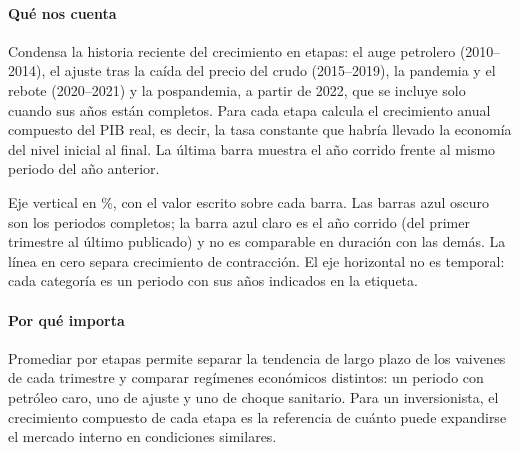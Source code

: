 \paragraph{Qué nos cuenta}
Condensa la historia reciente del crecimiento en etapas: el auge petrolero (2010–2014), el ajuste tras la caída del precio del crudo (2015–2019), la pandemia y el rebote (2020–2021) y la pospandemia, a partir de 2022, que se incluye solo cuando sus años están completos. Para cada etapa calcula el crecimiento anual compuesto del PIB real, es decir, la tasa constante que habría llevado la economía del nivel inicial al final. La última barra muestra el año corrido frente al mismo periodo del año anterior.

\begin{leer}
Eje vertical en \%, con el valor escrito sobre cada barra. Las barras azul oscuro son los periodos completos; la barra azul claro es el año corrido (del primer trimestre al último publicado) y no es comparable en duración con las demás. La línea en cero separa crecimiento de contracción. El eje horizontal no es temporal: cada categoría es un periodo con sus años indicados en la etiqueta.
\end{leer}

\paragraph{Por qué importa}
Promediar por etapas permite separar la tendencia de largo plazo de los vaivenes de cada trimestre y comparar regímenes económicos distintos: un periodo con petróleo caro, uno de ajuste y uno de choque sanitario. Para un inversionista, el crecimiento compuesto de cada etapa es la referencia de cuánto puede expandirse el mercado interno en condiciones similares.

